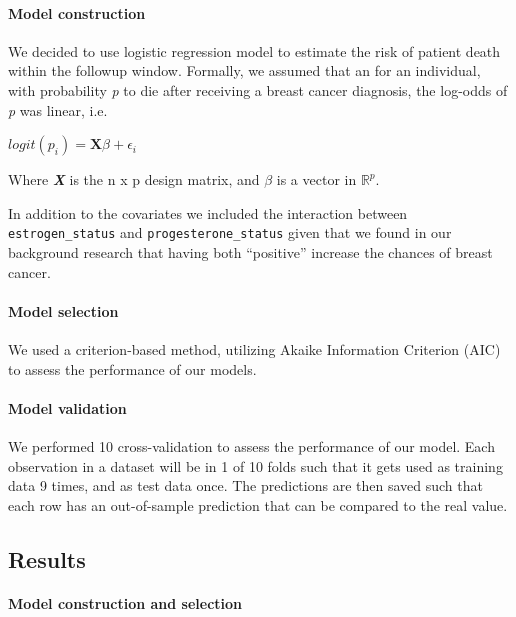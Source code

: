\documentclass[]{article}
\let\oldparagraph\paragraph
\renewcommand{\paragraph}[1]{\oldparagraph{#1}\mbox{}}
\begin{document}
\hypertarget{model-construction}{%
\paragraph{Model construction}\label{model-construction}}

We decided to use logistic regression model to estimate the risk of
patient death within the followup window. Formally, we assumed that an
for an individual, with probability \emph{p} to die after receiving a
breast cancer diagnosis, the log-odds of \emph{p} was linear, i.e.

\(logit(p_i) = \mathbf{X}\beta+ \epsilon_i\)

Where \textbf{\emph{X}} is the n x p design matrix, and \(\beta\) is a
vector in \(\mathbb{R}^p\).

In addition to the covariates we included the interaction between
\texttt{estrogen\_status} and \texttt{progesterone\_status} given that
we found in our background research that having both ``positive''
increase the chances of breast cancer.

\hypertarget{model-selection}{%
\paragraph{Model selection}\label{model-selection}}

We used a criterion-based method, utilizing Akaike Information Criterion
(AIC) to assess the performance of our models.

\hypertarget{model-validation}{%
\paragraph{Model validation}\label{model-validation}}

We performed 10 cross-validation to assess the performance of our model.
Each observation in a dataset will be in 1 of 10 folds such that it gets
used as training data 9 times, and as test data once. The predictions
are then saved such that each row has an out-of-sample prediction that
can be compared to the real value.

\hypertarget{results}{%
\subsection{Results}\label{results}}

\hypertarget{model-construction-and-selection}{%
\paragraph{Model construction and
selection}\label{model-construction-and-selection}}
\end{document}
